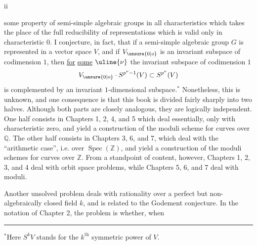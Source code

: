 \begin{center}ii\end{center}

some property of semi-simple algebraic groups in all characteristics which takes the place of the full reducibility of representations which is valid only in characteristic $0$. I conjecture, in fact, that if a semi-simple algebraic group $G$ is represented in a vector space $V$, and if $V_{\unsure{0|o}}$ is an invariant subspace of codimension $1$, then \uline{for} \uline{some} $\uline{\nu}$ the invariant subspace of codimension $1$
\[
V_{\unsure{0|o}}\cdot S^{p^\nu-1}(V)\subset S^{p^\nu}(V)
\]
is complemented by an invariant $1$-dimensional subspace.$^*$ Nonetheless, this is unknown, and one consequence is that this book is divided fairly sharply into two halves. Although both parts are closely analogous, they are logically independent. One half consists in Chapters 1, 2, 4, and 5 which deal essentially, only with characteristic zero, and yield a construction of the moduli scheme for curves over $\mathbb Q$. The other half consists in Chapters 3, 6, and 7, which deal with the ``arithmetic case'', i.e. over $\operatorname{Spec}(\mathbb Z)$, and yield a construction of the moduli schemes for curves over $\mathbb Z$. From a standpoint of content, however, Chapters 1, 2, 3, and 4 deal with orbit space problems, while Chapters 5, 6, and 7 deal with moduli.

Another unsolved problem deals with rationality over a perfect but non-algebraically closed field $k$, and is related to the Godement conjecture. In the notation of Chapter 2, the problem is whether, when

\noindent\rule{2cm}{.4pt}

$^*$Here $S^kV$ stands for the $k^{\mathrm{th}}$ symmetric power of $V$.

